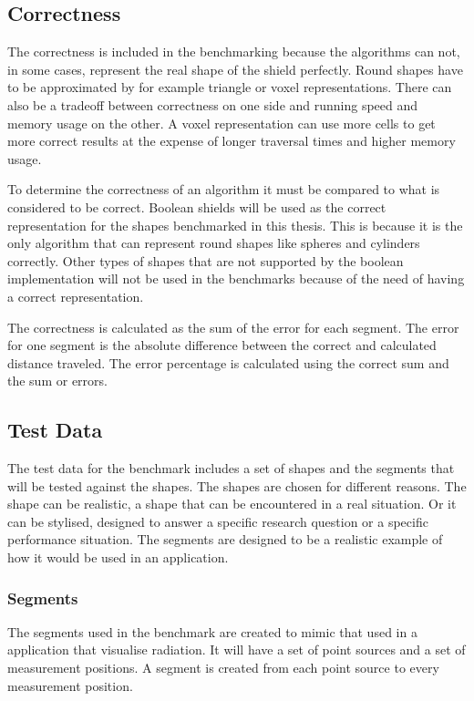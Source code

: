 \documentclass[11pt,twoside,a4paper]{report}
\begin{document}
\subsection{Correctness}
The correctness is included in the benchmarking because the algorithms can not, in some cases, represent the real shape of the shield perfectly. Round shapes have to be approximated by for example triangle or voxel representations. There can also be a tradeoff between correctness on one side and running speed and memory usage on the other. A voxel representation can use more cells to get more correct results at the expense of longer traversal times and higher memory usage. 

To determine the correctness of an algorithm it must be compared to what is considered to be correct. Boolean shields will be used as the correct representation for the shapes benchmarked in this thesis. This is because it is the only algorithm that can represent round shapes like spheres and cylinders correctly. Other types of shapes that are not supported by the boolean implementation will not be used in the benchmarks because of the need of having a correct representation.

The correctness is calculated as the sum of the error for each segment. The error for one segment is the absolute difference between the correct and calculated distance traveled. The error percentage is calculated using the correct sum and the sum or errors.

\subsection{Test Data}
The test data for the benchmark includes a set of shapes and the segments that will be tested against the shapes. The shapes are chosen for different reasons. The shape can be realistic, a shape that can be encountered in a real situation. Or it can be stylised, designed to answer a specific research question or a specific performance situation. The segments are designed to be a realistic example of how it would be used in an application.

\subsubsection{Segments}
The segments used in the benchmark are created to mimic that used in a application that visualise radiation. It will have a set of point sources and a set of measurement positions. A segment is created from each point source to every measurement position.  
\end{document}
